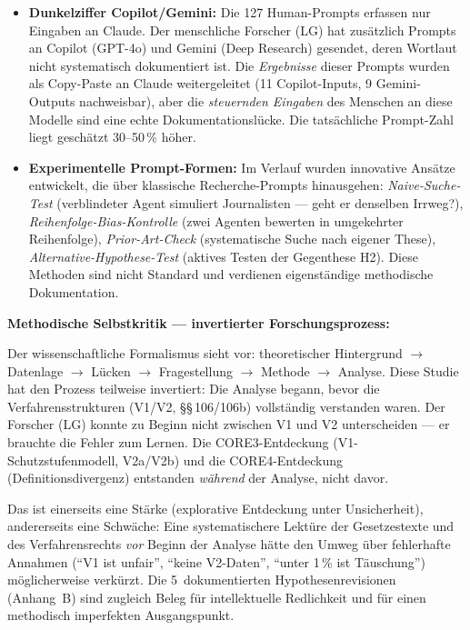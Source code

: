 \documentclass{umbruch-position}
\begin{document}
\begin{itemize}[nosep]
  \item \textbf{Dunkelziffer Copilot/Gemini:} Die 127 Human-Prompts erfassen nur Eingaben an Claude. Der menschliche Forscher (LG) hat zusätzlich Prompts an Copilot (GPT-4o) und Gemini (Deep Research) gesendet, deren Wortlaut nicht systematisch dokumentiert ist. Die \textit{Ergebnisse} dieser Prompts wurden als Copy-Paste an Claude weitergeleitet (11 Copilot-Inputs, 9 Gemini-Outputs nachweisbar), aber die \textit{steuernden Eingaben} des Menschen an diese Modelle sind eine echte Dokumentationslücke. Die tatsächliche Prompt-Zahl liegt geschätzt 30--50\,\% höher.
  \item \textbf{Experimentelle Prompt-Formen:} Im Verlauf wurden innovative Ansätze entwickelt, die über klassische Recherche-Prompts hinausgehen: \textit{Naive-Suche-Test} (verblindeter Agent simuliert Journalisten --- geht er denselben Irrweg?), \textit{Reihenfolge-Bias-Kontrolle} (zwei Agenten bewerten in umgekehrter Reihenfolge), \textit{Prior-Art-Check} (systematische Suche nach eigener These), \textit{Alternative-Hypothese-Test} (aktives Testen der Gegenthese H2). Diese Methoden sind nicht Standard und verdienen eigenständige methodische Dokumentation.
\end{itemize}

\noindent\textbf{Methodische Selbstkritik --- invertierter Forschungsprozess:}

Der wissenschaftliche Formalismus sieht vor: theoretischer Hintergrund $\to$ Datenlage $\to$ Lücken $\to$ Fragestellung $\to$ Methode $\to$ Analyse. Diese Studie hat den Prozess teilweise invertiert: Die Analyse begann, bevor die Verfahrensstrukturen (V1/V2, §\S\,106/106b) vollständig verstanden waren. Der Forscher (LG) konnte zu Beginn nicht zwischen V1 und V2 unterscheiden --- er brauchte die Fehler zum Lernen. Die CORE3-Entdeckung (V1-Schutzstufenmodell, V2a/V2b) und die CORE4-Entdeckung (Definitionsdivergenz) entstanden \textit{während} der Analyse, nicht davor.

Das ist einerseits eine Stärke (explorative Entdeckung unter Unsicherheit), andererseits eine Schwäche: Eine systematischere Lektüre der Gesetzestexte und des Verfahrensrechts \textit{vor} Beginn der Analyse hätte den Umweg über fehlerhafte Annahmen (``V1 ist unfair'', ``keine V2-Daten'', ``unter 1\,\% ist Täuschung'') möglicherweise verkürzt. Die 5~dokumentierten Hypothesenrevisionen (Anhang~B) sind zugleich Beleg für intellektuelle Redlichkeit und für einen methodisch imperfekten Ausgangspunkt.
\end{document}
